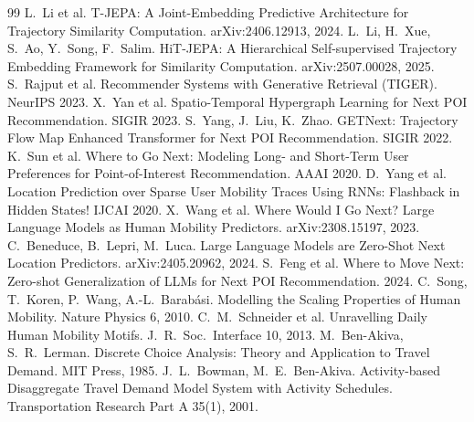 \documentclass[10.5pt]{article}
\begin{document}
\begin{thebibliography}{99}
 L.~Li et al. T-JEPA: A Joint-Embedding Predictive Architecture for Trajectory Similarity Computation. arXiv:2406.12913, 2024.
 L.~Li, H.~Xue, S.~Ao, Y.~Song, F.~Salim. HiT-JEPA: A Hierarchical Self-supervised Trajectory Embedding Framework for Similarity Computation. arXiv:2507.00028, 2025.
 S.~Rajput et al. Recommender Systems with Generative Retrieval (TIGER). NeurIPS 2023.
 X.~Yan et al. Spatio-Temporal Hypergraph Learning for Next POI Recommendation. SIGIR 2023.
 S.~Yang, J.~Liu, K.~Zhao. GETNext: Trajectory Flow Map Enhanced Transformer for Next POI Recommendation. SIGIR 2022.
 K.~Sun et al. Where to Go Next: Modeling Long- and Short-Term User Preferences for Point-of-Interest Recommendation. AAAI 2020.
 D.~Yang et al. Location Prediction over Sparse User Mobility Traces Using RNNs: Flashback in Hidden States! IJCAI 2020.
 X.~Wang et al. Where Would I Go Next? Large Language Models as Human Mobility Predictors. arXiv:2308.15197, 2023.
 C.~Beneduce, B.~Lepri, M.~Luca. Large Language Models are Zero-Shot Next Location Predictors. arXiv:2405.20962, 2024.
 S.~Feng et al. Where to Move Next: Zero-shot Generalization of LLMs for Next POI Recommendation. 2024.
 C.~Song, T.~Koren, P.~Wang, A.-L.~Barab\'asi. Modelling the Scaling Properties of Human Mobility. Nature Physics 6, 2010.
 C.~M.~Schneider et al. Unravelling Daily Human Mobility Motifs. J.\ R.\ Soc.\ Interface 10, 2013.
 M.~Ben-Akiva, S.~R.~Lerman. Discrete Choice Analysis: Theory and Application to Travel Demand. MIT Press, 1985.
 J.~L.~Bowman, M.~E.~Ben-Akiva. Activity-based Disaggregate Travel Demand Model System with Activity Schedules. Transportation Research Part A 35(1), 2001.
\end{thebibliography}
\end{document}
